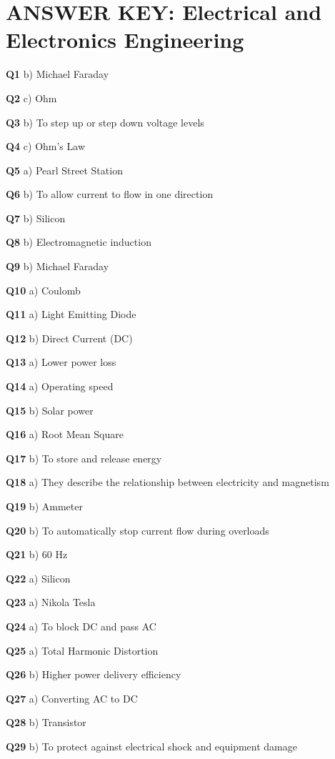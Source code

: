 \section{ANSWER KEY: Electrical and Electronics Engineering}

\textbf{Q1} b) Michael Faraday\par
\textbf{Q2} c) Ohm\par
\textbf{Q3} b) To step up or step down voltage levels\par
\textbf{Q4} c) Ohm's Law\par
\textbf{Q5} a) Pearl Street Station\par
\textbf{Q6} b) To allow current to flow in one direction\par
\textbf{Q7} b) Silicon\par
\textbf{Q8} b) Electromagnetic induction\par
\textbf{Q9} b) Michael Faraday\par
\textbf{Q10} a) Coulomb\par
\textbf{Q11} a) Light Emitting Diode\par
\textbf{Q12} b) Direct Current (DC)\par
\textbf{Q13} a) Lower power loss\par
\textbf{Q14} a) Operating speed\par
\textbf{Q15} b) Solar power\par
\textbf{Q16} a) Root Mean Square\par
\textbf{Q17} b) To store and release energy\par
\textbf{Q18} a) They describe the relationship between electricity and magnetism\par
\textbf{Q19} b) Ammeter\par
\textbf{Q20} b) To automatically stop current flow during overloads\par
\textbf{Q21} b) 60 Hz\par
\textbf{Q22} a) Silicon\par
\textbf{Q23} a) Nikola Tesla\par
\textbf{Q24} a) To block DC and pass AC\par
\textbf{Q25} a) Total Harmonic Distortion\par
\textbf{Q26} b) Higher power delivery efficiency\par
\textbf{Q27} a) Converting AC to DC\par
\textbf{Q28} b) Transistor\par
\textbf{Q29} b) To protect against electrical shock and equipment damage\par
